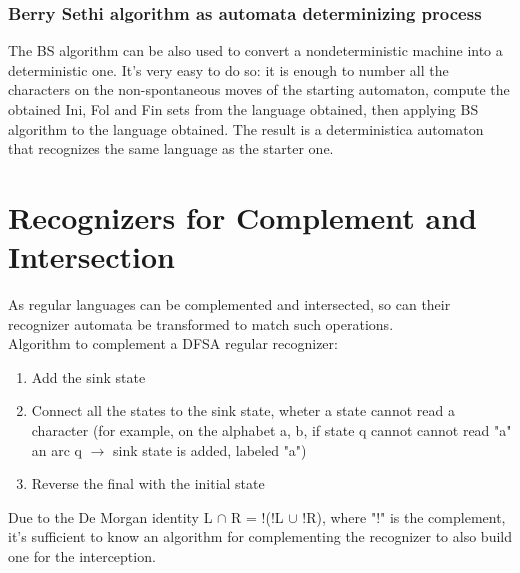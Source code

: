 \documentclass[10pt,a4paper]{article}
\begin{document}
				\subsubsection{Berry Sethi algorithm as automata determinizing process}
					The BS algorithm can be also used to convert a nondeterministic machine into a deterministic one. It's very easy to do so: it is enough to number all the characters on the non-spontaneous moves of the starting automaton, compute the obtained Ini, Fol and Fin sets from the language obtained, then applying BS algorithm to the language obtained. The result is a deterministica automaton that recognizes the same language as the starter one. 
				
		\section{Recognizers for Complement and Intersection}
			As regular languages can be complemented and intersected, so can their recognizer automata be transformed to match such operations.\\
			Algorithm to complement a DFSA regular recognizer:
			\begin{enumerate}
				\item Add the sink state
				\item Connect all the states to the sink state, wheter a state cannot read a character (for example, on the alphabet {a, b}, if state q cannot cannot read "a" an arc q $\rightarrow$ sink state is added, labeled "a")
				\item Reverse the final with the initial state
			\end{enumerate}
			
			Due to the De Morgan identity L $\cap$ R = !(!L $\cup$ !R), where "!" is the complement, it's sufficient to know an algorithm for complementing the recognizer to also build one for the interception. 
	
	\clearpage
\end{document}
